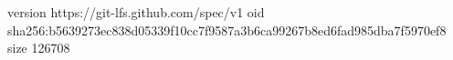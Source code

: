 version https://git-lfs.github.com/spec/v1
oid sha256:b5639273ec838d05339f10cc7f9587a3b6ca99267b8ed6fad985dba7f5970ef8
size 126708
